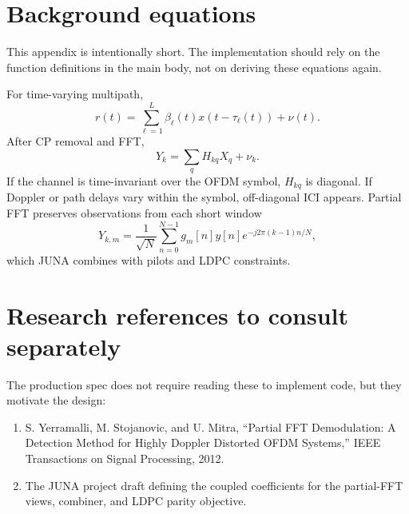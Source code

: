 \documentclass[11pt]{article}
\begin{document}
\clearpage
\appendix
\section{Background equations}

This appendix is intentionally short. The implementation should rely on the function definitions in the main body, not on deriving these equations again.

For time-varying multipath,
\begin{equation}
r(t)=\sum_{\ell=1}^L\beta_\ell(t)x(t-\tau_\ell(t))+\nu(t).
\end{equation}
After CP removal and FFT,
\begin{equation}
Y_k=\sum_qH_{kq}X_q+\nu_k.
\end{equation}
If the channel is time-invariant over the OFDM symbol, $H_{kq}$ is diagonal. If Doppler or path delays vary within the symbol, off-diagonal ICI appears. Partial FFT preserves observations from each short window
\begin{equation}
Y_{k,m}=\frac{1}{\sqrt N}\sum_{n=0}^{N-1}g_m[n]y[n]e^{-j2\pi(k-1)n/N},
\end{equation}
which JUNA combines with pilots and LDPC constraints.

\section{Research references to consult separately}

The production spec does not require reading these to implement code, but they motivate the design:
\begin{enumerate}
\item S. Yerramalli, M. Stojanovic, and U. Mitra, ``Partial FFT Demodulation: A Detection Method for Highly Doppler Distorted OFDM Systems,'' IEEE Transactions on Signal Processing, 2012.
\item The JUNA project draft defining the coupled coefficients for the partial-FFT views, combiner, and LDPC parity objective.
\end{enumerate}
\end{document}
